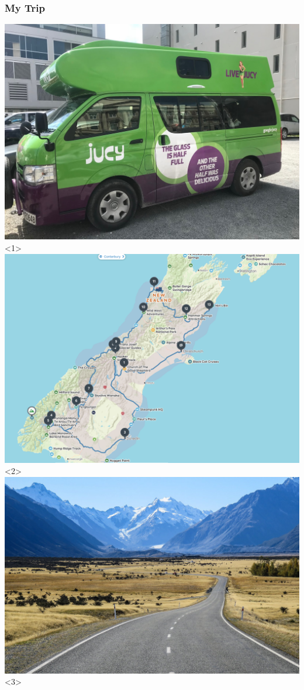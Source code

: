 \documentclass[12pt]{beamer}
\begin{document}
        \begin{frame}
            \frametitle{My Trip}
                \begin{center}
                    \includegraphics[height=0.6\textheight]{images/camper-van.jpg}<1>
                    \includegraphics[height=0.6\textheight]{images/map.png}<2>
                    \includegraphics[height=0.6\textheight]{images/mt-cook-road.jpg}<3>
                \end{center}
    

\end{frame}
\end{document}

